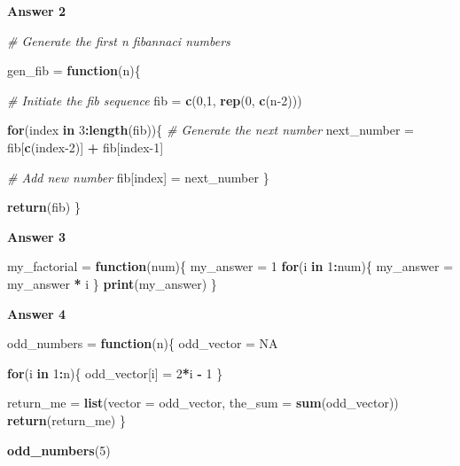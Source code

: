 \documentclass[
]{book}
\newenvironment{Shaded}{\begin{snugshade}}{\end{snugshade}}
\newcommand{\CommentTok}[1]{\textcolor[rgb]{0.56,0.35,0.01}{\textit{#1}}}
\newcommand{\ControlFlowTok}[1]{\textcolor[rgb]{0.13,0.29,0.53}{\textbf{#1}}}
\newcommand{\DataTypeTok}[1]{\textcolor[rgb]{0.13,0.29,0.53}{#1}}
\newcommand{\DecValTok}[1]{\textcolor[rgb]{0.00,0.00,0.81}{#1}}
\newcommand{\KeywordTok}[1]{\textcolor[rgb]{0.13,0.29,0.53}{\textbf{#1}}}
\newcommand{\NormalTok}[1]{#1}
\newcommand{\OperatorTok}[1]{\textcolor[rgb]{0.81,0.36,0.00}{\textbf{#1}}}
\newcommand{\OtherTok}[1]{\textcolor[rgb]{0.56,0.35,0.01}{#1}}
\newcommand{\StringTok}[1]{\textcolor[rgb]{0.31,0.60,0.02}{#1}}
\begin{document}
\textbf{Answer 2}

\begin{Shaded}
\begin{Highlighting}[]
\CommentTok{# Generate the first n fibannaci numbers}

\NormalTok{gen_fib =}\StringTok{ }\ControlFlowTok{function}\NormalTok{(n)\{}

  \CommentTok{# Initiate the fib sequence}
\NormalTok{  fib =}\StringTok{ }\KeywordTok{c}\NormalTok{(}\DecValTok{0}\NormalTok{,}\DecValTok{1}\NormalTok{, }\KeywordTok{rep}\NormalTok{(}\DecValTok{0}\NormalTok{, }\KeywordTok{c}\NormalTok{(n}\DecValTok{-2}\NormalTok{)))}
  
  \ControlFlowTok{for}\NormalTok{(index }\ControlFlowTok{in} \DecValTok{3}\OperatorTok{:}\KeywordTok{length}\NormalTok{(fib))\{}
    \CommentTok{# Generate the next number }
\NormalTok{    next_number =}\StringTok{ }\NormalTok{fib[}\KeywordTok{c}\NormalTok{(index}\DecValTok{-2}\NormalTok{)] }\OperatorTok{+}\StringTok{ }\NormalTok{fib[index}\DecValTok{-1}\NormalTok{]}
    
    \CommentTok{# Add new number }
\NormalTok{    fib[index] =}\StringTok{ }\NormalTok{next_number}
\NormalTok{  \}}
  
  \KeywordTok{return}\NormalTok{(fib)}
\NormalTok{\}}
\end{Highlighting}
\end{Shaded}

\textbf{Answer 3}

\begin{Shaded}
\begin{Highlighting}[]
\NormalTok{my_factorial =}\StringTok{ }\ControlFlowTok{function}\NormalTok{(num)\{}
\NormalTok{  my_answer =}\StringTok{ }\DecValTok{1}
  \ControlFlowTok{for}\NormalTok{(i }\ControlFlowTok{in} \DecValTok{1}\OperatorTok{:}\NormalTok{num)\{}
\NormalTok{    my_answer =}\StringTok{ }\NormalTok{my_answer }\OperatorTok{*}\StringTok{ }\NormalTok{i }
\NormalTok{  \}}
  \KeywordTok{print}\NormalTok{(my_answer)}
\NormalTok{\}}
\end{Highlighting}
\end{Shaded}

\textbf{Answer 4}

\begin{Shaded}
\begin{Highlighting}[]
\NormalTok{odd_numbers =}\StringTok{ }\ControlFlowTok{function}\NormalTok{(n)\{}
\NormalTok{    odd_vector =}\StringTok{ }\OtherTok{NA}
  
  \ControlFlowTok{for}\NormalTok{(i }\ControlFlowTok{in} \DecValTok{1}\OperatorTok{:}\NormalTok{n)\{}
\NormalTok{    odd_vector[i] =}\StringTok{ }\DecValTok{2}\OperatorTok{*}\NormalTok{i }\OperatorTok{-}\StringTok{ }\DecValTok{1}
\NormalTok{  \}}
    
\NormalTok{ return_me =}\StringTok{ }\KeywordTok{list}\NormalTok{(}\DataTypeTok{vector =}\NormalTok{ odd_vector, }
                  \DataTypeTok{the_sum =} \KeywordTok{sum}\NormalTok{(odd_vector))}
 \KeywordTok{return}\NormalTok{(return_me)}
\NormalTok{\}}

\KeywordTok{odd_numbers}\NormalTok{(}\DecValTok{5}\NormalTok{)}
\end{Highlighting}
\end{Shaded}
\end{document}
